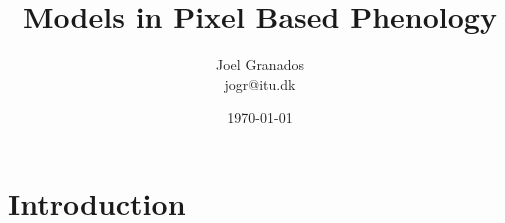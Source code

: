 \documentclass[a4paper,12pt]{report}
\begin{document}
\title{Models in Pixel Based Phenology}
\author{Joel Granados \\ jogr@itu.dk}
\date{ \today }

\maketitle

\section*{Introduction}
\end{document}
